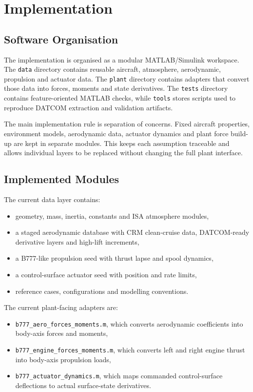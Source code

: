 \chapter{Implementation}

\section{Software Organisation}

The implementation is organised as a modular MATLAB/Simulink workspace. The
\texttt{data} directory contains reusable aircraft, atmosphere, aerodynamic,
propulsion and actuator data. The \texttt{plant} directory contains adapters
that convert those data into forces, moments and state derivatives. The
\texttt{tests} directory contains feature-oriented MATLAB checks, while
\texttt{tools} stores scripts used to reproduce DATCOM extraction and validation
artifacts.

The main implementation rule is separation of concerns. Fixed aircraft
properties, environment models, aerodynamic data, actuator dynamics and plant
force build-up are kept in separate modules. This keeps each assumption
traceable and allows individual layers to be replaced without changing the full
plant interface.

\section{Implemented Modules}

The current data layer contains:
\begin{itemize}
    \item geometry, mass, inertia, constants and ISA atmosphere modules,
    \item a staged aerodynamic database with CRM clean-cruise data, DATCOM-ready
    derivative layers and high-lift increments,
    \item a B777-like propulsion seed with thrust lapse and spool dynamics,
    \item a control-surface actuator seed with position and rate limits,
    \item reference cases, configurations and modelling conventions.
\end{itemize}

The current plant-facing adapters are:
\begin{itemize}
    \item \texttt{b777\_aero\_forces\_moments.m}, which converts aerodynamic
    coefficients into body-axis forces and moments,
    \item \texttt{b777\_engine\_forces\_moments.m}, which converts left and
    right engine thrust into body-axis propulsion loads,
    \item \texttt{b777\_actuator\_dynamics.m}, which maps commanded
    control-surface deflections to actual surface-state derivatives.
\end{itemize}

